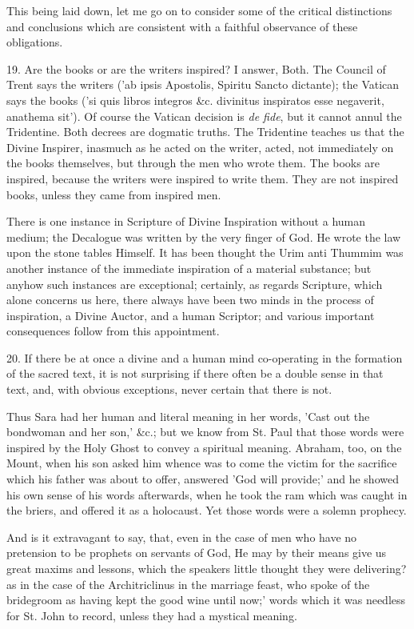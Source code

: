 This being laid down, let me go on to consider
some of the critical distinctions and conclusions which are consistent
with a faithful observance of these obligations.

19. Are the books or are the writers inspired? I
answer, Both. The Council of Trent says the writers ('ab ipsis
Apostolis, Spiritu Sancto dictante); the Vatican says the books ('si
quis libros integros \&c. divinitus inspiratos esse negaverit,
anathema sit'). Of course the Vatican decision is \emph{de fide}, but
it cannot annul the Tridentine. Both decrees are dogmatic truths. The
Tridentine teaches us that the Divine Inspirer, inasmuch as he acted
on the writer, acted, not immediately on the books themselves, but
through the men who wrote them. The books are inspired, because the
writers were inspired to write them. They are not inspired books,
unless they came from inspired men.

There is one instance in Scripture of Divine
Inspiration without a human medium; the Decalogue was written by the
very finger of God. He wrote the law upon the stone tables Himself. It
has been thought the Urim anti Thummim was another instance of the
immediate inspiration of a material substance; but anyhow such
instances are exceptional; certainly, as regards Scripture, which
alone concerns us here, there always have been two minds in the
process of inspiration, a Divine Auctor, and a human Scriptor; and
various important consequences follow from this appointment.

20. If there be at once a divine and a human mind
co-operating in the formation of the sacred text, it is not surprising
if there often be a double sense in that text, and, with obvious
exceptions, never certain that there is not.

Thus Sara had her human and literal meaning in
her words, 'Cast out the bondwoman and her son,' \&c.; but we know
from St. Paul that those words were inspired by the Holy Ghost to
convey a spiritual meaning. Abraham, too, on the Mount, when his son
asked him whence was to come the victim for the sacrifice which
his father was about to offer, answered 'God will provide;' and he
showed his own sense of his words afterwards, when he took the ram
which was caught in the briers, and offered it as a holocaust. Yet
those words were a solemn prophecy.

And is it extravagant to say, that, even in the
case of men who have no pretension to be prophets on servants of God,
He may by their means give us great maxims and lessons, which the
speakers little thought they were delivering? as in the case of the
Architriclinus in the marriage feast, who spoke of the bridegroom as
having kept the good wine until now;' words which it was needless for
St. John to record, unless they had a mystical meaning.

